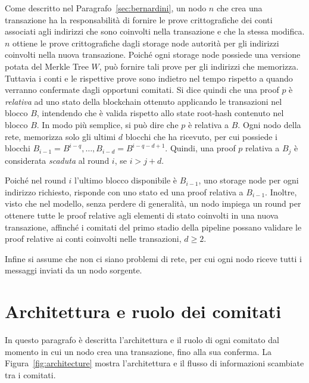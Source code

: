 Come descritto nel Paragrafo~\ref{sec:bernardini}, un nodo $n$ che crea una transazione ha la responsabilità di fornire le prove crittografiche dei conti associati agli indirizzi che sono coinvolti nella transazione e che la stessa modifica. $n$ ottiene le prove crittografiche dagli storage node autorità per gli indirizzi coinvolti nella nuova transazione. Poiché ogni storage node possiede una versione potata del Merkle Tree $W$, può fornire tali prove per gli indirizzi che memorizza. Tuttavia i conti e le rispettive prove sono indietro nel tempo rispetto a quando verranno confermate dagli opportuni comitati. Si dice quindi che una proof $p$ è \emph{relativa} ad uno stato della blockchain ottenuto applicando le transazioni nel blocco $B$, intendendo che è valida rispetto allo state root-hash contenuto nel blocco $B$. In modo più semplice, si può dire che $p$ è relativa a $B$.
Ogni nodo della rete, memorizza solo gli ultimi $d$ blocchi che ha ricevuto, per cui possiede i blocchi $B_{i-1}=B^{i-q}, \dots, B_{i-d}=B^{i-q-d+1}$. Quindi, una proof $p$ relativa a $B_j$ è considerata \emph{scaduta} al round $i$, se $i > j + d$.

Poiché nel round $i$ l'ultimo blocco disponibile è $B_{i-1}$, uno storage node per ogni indirizzo richiesto, risponde con uno stato ed una proof relativa a $B_{i-1}$. Inoltre, visto che nel modello, senza perdere di generalità, un nodo impiega un round per ottenere tutte le proof relative agli elementi di stato coinvolti in una nuova transazione, affinché i comitati del primo stadio della pipeline possano validare le proof relative ai conti coinvolti nelle transazioni, $d \geq 2$.

Infine si assume che non ci siano problemi di rete, per cui ogni nodo riceve tutti i messaggi inviati da un nodo sorgente.

\section{Architettura e ruolo dei comitati}\label{sec:architettura}

In questo paragrafo è descritta l'architettura e il ruolo di ogni comitato dal momento in cui un nodo crea una transazione, fino alla sua conferma. La Figura~\ref{fig:architecture} mostra l'architettura e il flusso di informazioni scambiate tra i comitati.

